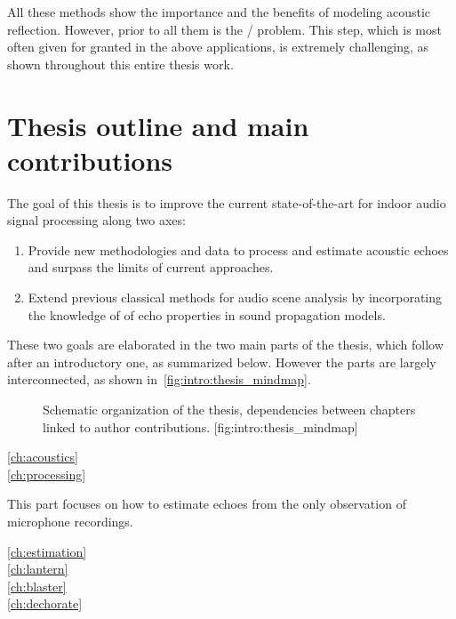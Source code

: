 \mynewline
All these methods show the importance and the benefits of modeling acoustic reflection.
However, prior to all them is the \AERdef/ problem.
This step, which is most often given for granted in the above applications, is extremely challenging, as shown throughout this entire thesis work.

\section{Thesis outline and main contributions}
The goal of this thesis is to improve the current state-of-the-art for indoor audio signal processing along two axes:
\begin{enumerate}
    \item Provide new methodologies and data to process and estimate acoustic echoes and surpass the limits of current approaches.
    \item Extend previous classical methods for audio scene analysis by incorporating the knowledge of of echo properties in sound propagation models.
\end{enumerate}
These two goals are elaborated in the two main parts of the thesis, which follow after an introductory one, as summarized below.
However the parts are largely interconnected, as shown in~\cref{fig:intro:thesis_mindmap}.

\begin{figure}[t]
    \begin{sidecaption}{%
        Schematic organization of the thesis, dependencies between chapters linked to author contributions.
    }[fig:intro:thesis_mindmap]
    \centering
    \resizebox{\linewidth}{!}{
        
    }
    \end{sidecaption}
\end{figure}


\begin{description}
    \item[\cref{ch:acoustics}]\synopsisChAcoustics
    \item[\cref{ch:processing}]\synopsisChProcessing
\end{description}

This part focuses on how to estimate echoes from the only observation of microphone recordings.
\begin{description}
    \item[\cref{ch:estimation}]\synopsisChEstimation
    \item[\cref{ch:lantern}]\synopsisChLantern
    \item[\cref{ch:blaster}]\synopsisChBlaster
    \item[\cref{ch:dechorate}]\synopsisChDechorate
\end{description}


